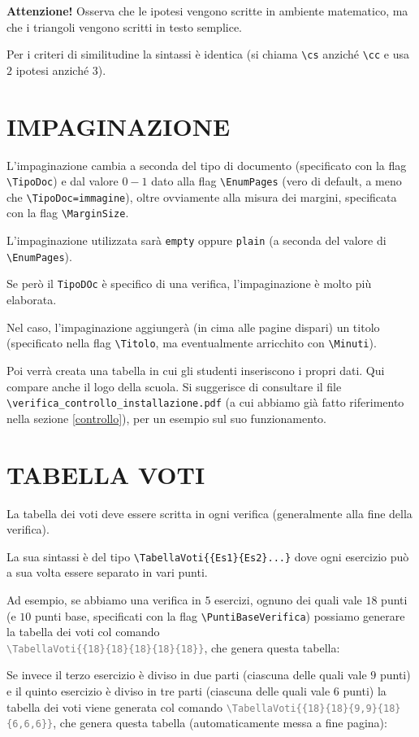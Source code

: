 \documentclass[italian, a4paper]{article}
\newcommand{\bs}{\textbackslash}
\newcommand{\ttt}[1]{\texttt{#1}}
\begin{document}
\textbf{Attenzione!} Osserva che le ipotesi vengono scritte in ambiente matematico, ma che i triangoli vengono scritti in testo semplice.

Per i criteri di similitudine la sintassi è identica (si chiama \ttt{\bs cs} anziché \ttt{\bs cc} e usa $2$ ipotesi anziché $3$).

\section{IMPAGINAZIONE}
L'impaginazione cambia a seconda del tipo di documento (specificato con la flag \ttt{\bs TipoDoc}) e dal valore $0-1$ dato alla flag \ttt{\bs EnumPages} (vero di default, a meno che \ttt{\bs TipoDoc=immagine}), oltre ovviamente alla misura dei margini, specificata con la flag \ttt{\bs MarginSize}.

L'impaginazione utilizzata sarà \ttt{empty} oppure \ttt{plain} (a seconda del valore di \ttt{\bs EnumPages}).

Se però il \ttt{TipoDOc} è specifico di una verifica, l'impaginazione è molto più elaborata.

Nel caso, l'impaginazione aggiungerà (in cima alle pagine dispari) un titolo (specificato nella flag \ttt{\bs Titolo}, ma eventualmente arricchito con \ttt{\bs Minuti}).

Poi verrà creata una tabella in cui gli studenti inseriscono i propri dati. Qui compare anche il logo della scuola. Si suggerisce di consultare il file \ttt{\bs verifica\_controllo\_installazione.pdf} (a cui abbiamo già fatto riferimento nella sezione \ref{controllo}), per un esempio sul suo funzionamento.

\section{TABELLA VOTI}
La tabella dei voti deve essere scritta in ogni verifica (generalmente alla fine della verifica).

La sua sintassi è del tipo \ttt{\bs TabellaVoti\{\{Es1\}\{Es2\}...\}} dove ogni esercizio può a sua volta essere separato in vari punti.

Ad esempio, se abbiamo una verifica in $5$ esercizi, ognuno dei quali vale $18$ punti (e $10$ punti base, specificati con la flag \ttt{\bs PuntiBaseVerifica}) possiamo generare la tabella dei voti col comando\\\textcolor{gray}{\ttt{\bs TabellaVoti\{\{18\}\{18\}\{18\}\{18\}\{18\}\}}}, che genera questa tabella:


Se invece il terzo esercizio è diviso in due parti (ciascuna delle quali vale $9$ punti) e il quinto esercizio è diviso in tre parti (ciascuna delle quali vale $6$ punti) la tabella dei voti viene generata col comando \textcolor{gray}{\ttt{\bs TabellaVoti\{\{18\}\{18\}\{9,9\}\{18\}\{6,6,6\}\}}}, che genera questa tabella (automaticamente messa a fine pagina):

\end{document}
